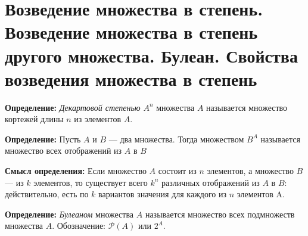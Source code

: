\setcounter{section}{10}

\section{Возведение множества в степень. Возведение множества в степень другого множества. Булеан. Свойства возведения множества в степень}
\par  \textbf{Определение: }\textit{Декартовой степенью} $A^n$ множества $A$ называется множество кортежей длины $n$ из элементов $A$.

\par \textbf{Определение: }Пусть $A$ и $B$ — два множества. Тогда множеством $B^A$ называется множество всех отображений из $A$ в $B$

\par \textbf{Смысл определения:} Если множество $A$ состоит из $n$ элементов, а множество $B$ — из $k$ элементов, то существует всего $k^n$ различных отображений из $A$ в $B$: действительно, есть по $k$ вариантов значения для каждого из $n$ элементов A.

\par \textbf{Определение: }\textit{Булеаном} множества $A$ называется множество всех подмножеств
множества $A$. Обозначение: $\mathcal{P}(A)$ или $2^A$.
